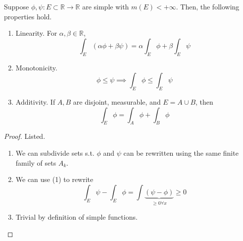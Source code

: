   \begin{theorem}
    Suppose $\phi, \psi: E \subset \mathbb{R} \to \mathbb{R}$ are simple with $m(E) < +\infty$. Then, the following properties hold. 
    \begin{enumerate}
      \item Linearity. For $\alpha, \beta \in \mathbb{R}$, 
        \begin{equation}
          \int_E (\alpha \phi + \beta \psi) = \alpha \int_E \phi + \beta \int_E \psi
        \end{equation}

      \item Monotonicity. 
        \begin{equation}
          \phi \leq \psi \implies \int_E \phi \leq \int_E \psi 
        \end{equation}

      \item Additivity. If $A, B$ are disjoint, measurable, and $E = A \cup B$, then 
        \begin{equation}
          \int_E \phi = \int_A \phi + \int_B \phi
        \end{equation}
    \end{enumerate}
  \end{theorem}
  \begin{proof}
    Listed. 
    \begin{enumerate}
      \item We can subdivide sets s.t. $\phi$ and $\psi$ can be rewritten using the same finite family of sets $A_k$. 
      \item We can use (1) to rewrite 
        \begin{equation}
          \int_E \psi - \int_E \phi = \int \underbrace{(\psi - \phi)}_{\geq 0 \forall x} \geq 0
        \end{equation}

      \item Trivial by definition of simple functions. 
    \end{enumerate}
  \end{proof}

